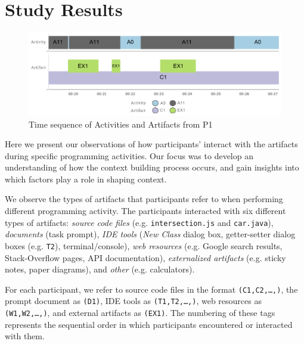 
\section{Study Results}



\begin{figure}
\includegraphics[width=\columnwidth]{figures/P1timeplot}
\caption{Time sequence of Activities and Artifacts from P1}
\label{P1Fig}
\end{figure}

Here we present our observations of how participants' interact with the artifacts during specific programming activities. Our focus was to develop an understanding of how the context building process occurs, and gain insights into which factors play a role in shaping context.


We observe the types of artifacts that participants refer to when performing different programming activity. The participants interacted with six different types of artifacts: \textit{source code files} (e.g. \texttt{intersection.js} and \texttt{car.java}), \textit{documents} (task prompt), \textit{IDE tools} (\textit{New Class} dialog box, getter-setter dialog boxes (e.g. \texttt{T2}), terminal/console),\textit{ web resources} (e.g. Google search results, Stack-Overflow pages, API documentation), \textit{externalized artifacts} (e.g. sticky notes, paper diagrams), and \textit{other} (e.g. calculators).

For each participant, we refer to source code files in the format \texttt{(C1,C2,\ldots,)}, the prompt document as \texttt{(D1)}, IDE tools as \texttt{(T1,T2,\ldots,)}, web resources as \texttt{(W1,W2,\ldots,)}, and external artifacts as \texttt{(EX1)}. The numbering of these tags represents the sequential order in which participants encountered or interacted with them.

